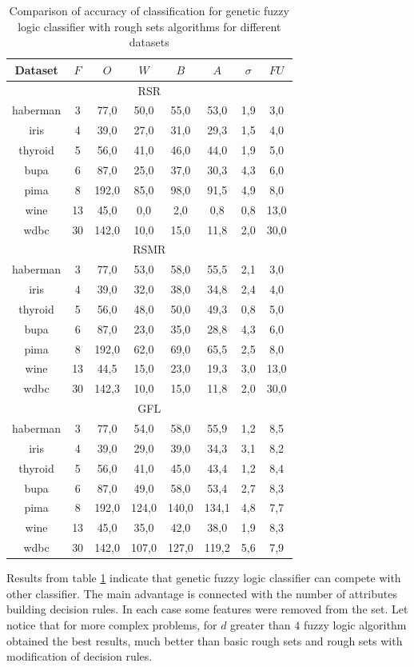 \begin{table}[H]
    \caption{Comparison of accuracy of classification for genetic fuzzy logic classifier with
    rough sets algorithms for different datasets}
    \centering
    \begin{tabular}{|c|c|c|c|c|c|c|c|}
        \hline
        Dataset&$F$&$O$&$W$&$B$&$A$&$\sigma$&$FU$\\ \hline \hline
        \multicolumn{8}{|c|}{RSR}\\ \hline
        haberman&3&77,0&50,0&55,0&53,0&1,9&3,0\\ \hline
        iris&4&39,0&27,0&31,0&29,3&1,5&4,0\\ \hline
        thyroid&5&56,0&41,0&46,0&44,0&1,9&5,0\\ \hline
        bupa&6&87,0&25,0&37,0&30,3&4,3&6,0\\ \hline
        pima&8&192,0&85,0&98,0&91,5&4,9&8,0\\ \hline
        wine&13&45,0&0,0&2,0&0,8&0,8&13,0\\ \hline
        wdbc&30&142,0&10,0&15,0&11,8&2,0&30,0\\ \hline \hline

        \multicolumn{8}{|c|}{RSMR}\\ \hline
        haberman&3&77,0&53,0&58,0&55,5&2,1&3,0\\ \hline
        iris&4&39,0&32,0&38,0&34,8&2,4&4,0\\ \hline
        thyroid&5&56,0&48,0&50,0&49,3&0,8&5,0\\ \hline
        bupa&6&87,0&23,0&35,0&28,8&4,3&6,0\\ \hline
        pima&8&192,0&62,0&69,0&65,5&2,5&8,0\\ \hline
        wine&13&44,5&15,0&23,0&19,3&3,0&13,0\\ \hline
        wdbc&30&142,3&10,0&15,0&11,8&2,0&30,0\\ \hline \hline

        \multicolumn{8}{|c|}{GFL}\\ \hline
        haberman&3&77,0&54,0&58,0&55,9&1,2&8,5\\ \hline
        iris&4&39,0&29,0&39,0&34,3&3,1&8,2\\ \hline
        thyroid&5&56,0&41,0&45,0&43,4&1,2&8,4\\ \hline
        bupa&6&87,0&49,0&58,0&53,4&2,7&8,3\\ \hline
        pima&8&192,0&124,0&140,0&134,1&4,8&7,7\\ \hline
        wine&13&45,0&35,0&42,0&38,0&1,9&8,3\\ \hline
        wdbc&30&142,0&107,0&127,0&119,2&5,6&7,9\\ \hline
    \end{tabular}
    \label{tab:genetic_fuzzy_results}
\end{table}
Results from table \ref{tab:genetic_fuzzy_results} indicate that genetic fuzzy
logic classifier can compete with other classifier. The main advantage is
connected with the number of attributes building decision rules. In each case
some features were removed from the set. Let notice that for more complex
problems, for $d$ greater than $4$ fuzzy logic algorithm obtained the best
results, much better than basic rough sets and rough sets with modification of
decision rules.

